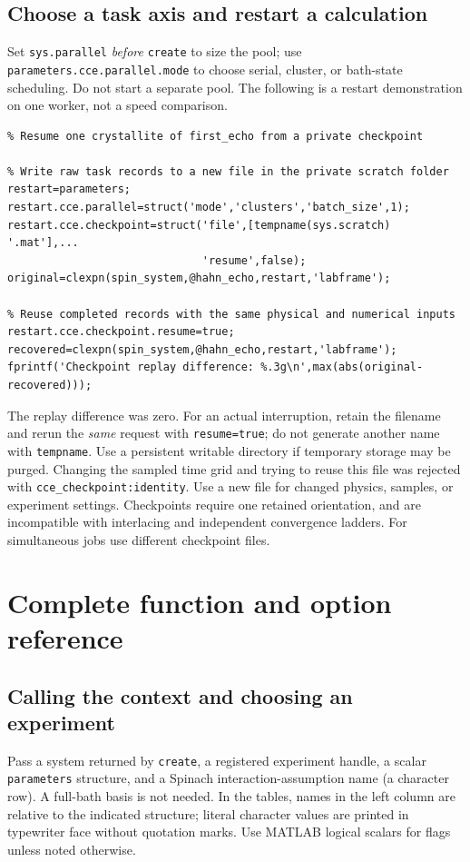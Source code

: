 \documentclass[11pt,a4paper]{article}
\newcommand{\code}[1]{\texttt{#1}}
\begin{document}
\subsection{Choose a task axis and restart a calculation}
Set \code{sys.parallel} \emph{before} \code{create} to size the pool; use \code{parameters.cce.parallel.mode} to choose serial, cluster, or bath-state scheduling. Do not start a separate pool. The following is a restart demonstration on one worker, not a speed comparison.
\begin{lstlisting}
% Resume one crystallite of first_echo from a private checkpoint

% Write raw task records to a new file in the private scratch folder
restart=parameters;
restart.cce.parallel=struct('mode','clusters','batch_size',1);
restart.cce.checkpoint=struct('file',[tempname(sys.scratch) '.mat'],...
                              'resume',false);
original=clexpn(spin_system,@hahn_echo,restart,'labframe');

% Reuse completed records with the same physical and numerical inputs
restart.cce.checkpoint.resume=true;
recovered=clexpn(spin_system,@hahn_echo,restart,'labframe');
fprintf('Checkpoint replay difference: %.3g\n',max(abs(original-recovered)));
\end{lstlisting}
The replay difference was zero. For an actual interruption, retain the filename and rerun the \emph{same} request with \code{resume=true}; do not generate another name with \code{tempname}. Use a persistent writable directory if temporary storage may be purged. Changing the sampled time grid and trying to reuse this file was rejected with \code{cce\_checkpoint:identity}. Use a new file for changed physics, samples, or experiment settings. Checkpoints require one retained orientation, and are incompatible with interlacing and independent convergence ladders. For simultaneous jobs use different checkpoint files.

\section{Complete function and option reference}
\label{sec:reference}

\subsection{Calling the context and choosing an experiment}
Pass a system returned by \code{create}, a registered experiment handle, a scalar \code{parameters} structure, and a Spinach interaction-assumption name (a character row). A full-bath basis is not needed. In the tables, names in the left column are relative to the indicated structure; literal character values are printed in typewriter face without quotation marks. Use MATLAB logical scalars for flags unless noted otherwise.
\end{document}
